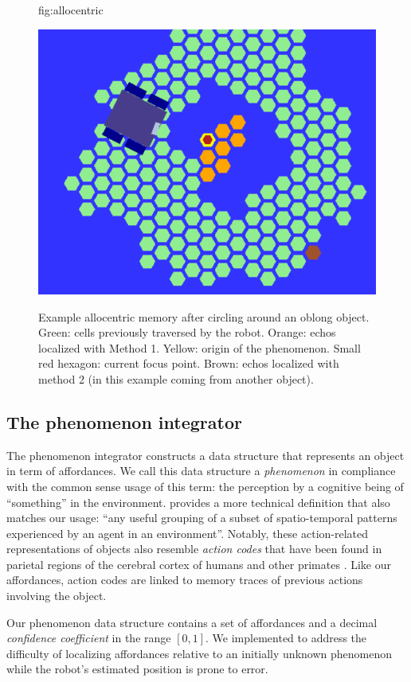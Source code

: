 \documentclass[pmlr]{jmlr}%
\begin{document}
\begin{figure}[htbp]
	\floatconts
	{fig:allocentric}
	{\caption{Example allocentric memory after circling around an oblong object. 
	Green: cells previously traversed by the robot. 
	Orange: echos localized with Method 1.
	Yellow: origin of the phenomenon. 
	Small red hexagon: current focus point.
	Brown: echos localized with method 2 (in this example coming from another object).}}
	{\includegraphics[width=0.4\linewidth]{images/Figure_4_allocentric_memory}}
\end{figure}


\subsection{The phenomenon integrator}

The phenomenon integrator constructs a data structure that represents an object in term of affordances. 
We call this data structure a \textit{phenomenon} in compliance with the common sense usage of this term: the perception by a cognitive being of ``something'' in the environment.
\cite[][p. 8]{thorisson_explanation_2021} provides a more technical definition that also matches our usage: ``any useful grouping of a subset of spatio-temporal patterns experienced by an agent in an environment''.
Notably, these action-related representations of objects also resemble \textit{action codes} that have been found in parietal regions of the cerebral cortex of humans and other primates \citep{chao_representation_2000,colby_space_1999, schubotz_objects_2014}. 
Like our affordances, action codes are linked to memory traces of previous actions involving the object.

Our phenomenon data structure contains a set of affordances and a decimal \textit{confidence coefficient} in the range $[0, 1]$. 
We implemented  to address the difficulty of localizing affordances relative to an initially unknown phenomenon while the robot's estimated position is prone to error. 
\end{document}
